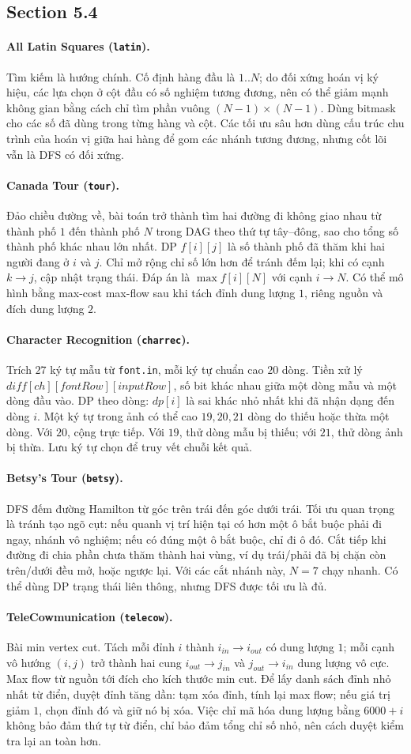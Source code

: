 \documentclass[11pt]{article}
\newcommand{\problem}[2]{\paragraph{#1 (\texttt{#2}).}}
\begin{document}
\subsection*{Section 5.4}

\problem{All Latin Squares}{latin}
Tìm kiếm là hướng chính. Cố định hàng đầu là \(1..N\); do đối xứng hoán vị ký hiệu, các lựa chọn ở cột đầu có số nghiệm tương đương, nên có thể giảm mạnh không gian bằng cách chỉ tìm phần vuông \((N-1)\times(N-1)\). Dùng bitmask cho các số đã dùng trong từng hàng và cột. Các tối ưu sâu hơn dùng cấu trúc chu trình của hoán vị giữa hai hàng để gom các nhánh tương đương, nhưng cốt lõi vẫn là DFS có đối xứng.

\problem{Canada Tour}{tour}
Đảo chiều đường về, bài toán trở thành tìm hai đường đi không giao nhau từ thành phố \(1\) đến thành phố \(N\) trong DAG theo thứ tự tây--đông, sao cho tổng số thành phố khác nhau lớn nhất. DP \(f[i][j]\) là số thành phố đã thăm khi hai người đang ở \(i\) và \(j\). Chỉ mở rộng chỉ số lớn hơn để tránh đếm lại; khi có cạnh \(k\to j\), cập nhật trạng thái. Đáp án là \(\max f[i][N]\) với cạnh \(i\to N\). Có thể mô hình bằng max-cost max-flow sau khi tách đỉnh dung lượng \(1\), riêng nguồn và đích dung lượng \(2\).

\problem{Character Recognition}{charrec}
Trích \(27\) ký tự mẫu từ \texttt{font.in}, mỗi ký tự chuẩn cao \(20\) dòng. Tiền xử lý \(diff[ch][fontRow][inputRow]\), số bit khác nhau giữa một dòng mẫu và một dòng đầu vào. DP theo dòng: \(dp[i]\) là sai khác nhỏ nhất khi đã nhận dạng đến dòng \(i\). Một ký tự trong ảnh có thể cao \(19,20,21\) dòng do thiếu hoặc thừa một dòng. Với \(20\), cộng trực tiếp. Với \(19\), thử dòng mẫu bị thiếu; với \(21\), thử dòng ảnh bị thừa. Lưu ký tự chọn để truy vết chuỗi kết quả.

\problem{Betsy's Tour}{betsy}
DFS đếm đường Hamilton từ góc trên trái đến góc dưới trái. Tối ưu quan trọng là tránh tạo ngõ cụt: nếu quanh vị trí hiện tại có hơn một ô bắt buộc phải đi ngay, nhánh vô nghiệm; nếu có đúng một ô bắt buộc, chỉ đi ô đó. Cắt tiếp khi đường đi chia phần chưa thăm thành hai vùng, ví dụ trái/phải đã bị chặn còn trên/dưới đều mở, hoặc ngược lại. Với các cắt nhánh này, \(N=7\) chạy nhanh. Có thể dùng DP trạng thái liên thông, nhưng DFS được tối ưu là đủ.

\problem{TeleCowmunication}{telecow}
Bài min vertex cut. Tách mỗi đỉnh \(i\) thành \(i_{in}\to i_{out}\) có dung lượng \(1\); mỗi cạnh vô hướng \((i,j)\) trở thành hai cung \(i_{out}\to j_{in}\) và \(j_{out}\to i_{in}\) dung lượng vô cực. Max flow từ nguồn tới đích cho kích thước min cut. Để lấy danh sách đỉnh nhỏ nhất từ điển, duyệt đỉnh tăng dần: tạm xóa đỉnh, tính lại max flow; nếu giá trị giảm \(1\), chọn đỉnh đó và giữ nó bị xóa. Việc chỉ mã hóa dung lượng bằng \(6000+i\) không bảo đảm thứ tự từ điển, chỉ bảo đảm tổng chỉ số nhỏ, nên cách duyệt kiểm tra lại an toàn hơn.
\end{document}
